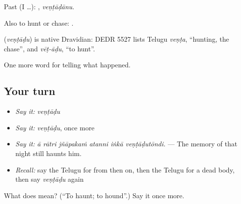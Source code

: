 Past (I …): , \emph{veṇṭāḍānu}.

Also to hunt or chase:   .

\begin{cousinweb}
\textbf{} (\emph{veṇṭāḍu}) is native Dravidian: DEDR 5527 lists Telugu \emph{veṇṭa}, \textquotedblleft{}hunting, the chase\textquotedblright{}, and \emph{vēṭ-āḍu}, \textquotedblleft{}to hunt\textquotedblright{}.
\end{cousinweb}

\begin{grammarlens}[title={What you've built}]
One more word for telling what happened.
\end{grammarlens}

\subsection*{Your turn}
\begin{itemize}
\raggedright
  \item \emph{Say it:} \emph{veṇṭāḍu}
  \item \emph{Say it:} \emph{veṇṭāḍu}, once more
  \item \emph{Say it:} \emph{ā rātri jñāpakaṁ atanni iṅkā veṇṭāḍutōndi.} — The memory of that night still haunts him.
  \item \emph{Recall:} say the Telugu for from then on, then the Telugu for a dead body, then say \emph{veṇṭāḍu} again
\end{itemize}

\begin{tcolorbox}[breakable,colback=teal!4,colframe=teal!35!black,title={Before you move on}]
What does  mean? (\textquotedblleft{}To haunt; to hound\textquotedblright{}.) Say it once more.
\end{tcolorbox}
